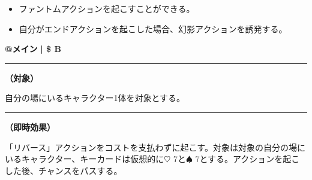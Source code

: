\documentclass[twocolumn,a5paper,papersize,10pt]{jarticle}
\begin{document}
\vspace{-1zh}%
\begin{itemize}
\setlength{\leftskip}{-0.3cm}
\setlength{\parskip}{0pt} %

\item ファントムアクションを起こすことができる。

\item 自分がエンドアクションを起こした場合、幻影アクションを誘発する。
\vspace{-1zh}%
\end{itemize}

\begin{tcolorbox}[title={\small\bf【Action】ファントム}{\scriptsize （通常魔法）}]

{\scriptsize\bf @メイン }
  {\scriptsize\bf | \$ B }

\vspace{1mm} %
\hrule height 0.1mm depth 0mm width 62mm %
\vspace{1mm} %

{\bf（対象）}

自分の場にいるキャラクター1体を対象とする。

\vspace{1mm} %
\hrule height 0.1mm depth 0mm width 62mm %
\vspace{1mm} %

{\bf（即時効果）}

「リバース」アクションをコストを支払わずに起こす。対象は対象の自分の場にいるキャラクター、キーカードは仮想的に{\normalsize $\heartsuit$} 7と{\normalsize $\spadesuit$} 7とする。アクションを起こした後、チャンスをパスする。

\vspace{1mm} %
\end{tcolorbox}
\end{document}
